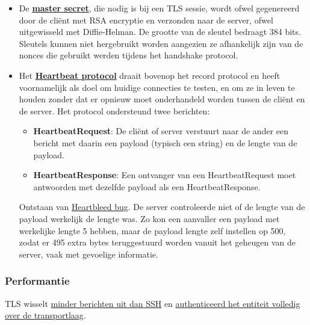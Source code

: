 \documentclass{report}
\begin{document}
\begin{itemize}
\begin{itemize}
		\end{itemize}
	De TLS record header heeft volgende structuur (figuur \ref{fig:tls_record_header}):
	\begin{figure}[ht]
		\texttt{[image: tls\_record\_header]}
		\caption{De TLS record header.}
		\label{fig:tls_record_header}
	\end{figure}
	\begin{itemize}
		\item 1 byte voor het contenttype. Dit is het applicatielaagprotocol dat gebruikt wordt.
		\item 2 bytes voor de versie (voor TLS 1.2 heeft dit de waarden 3 en 3).
		\item Lengte van de informatie.
	\end{itemize}

	\item De \underline{\textbf{master secret}}, die nodig is bij een TLS sessie, wordt ofwel gegenereerd door de cliënt met RSA encryptie en verzonden naar de server, ofwel uitgewisseld met Diffie-Helman. De grootte van de sleutel bedraagt 384 bits. Sleutels kunnen niet hergebruikt worden aangezien ze afhankelijk zijn van de nonces die gebruikt werden tijdens het handshake protocol.
	\item Het \underline{\textbf{Heartbeat protocol}} draait bovenop het record protocol en heeft voornamelijk als doel om huidige connecties te testen, en om ze in leven te houden zonder dat er opnieuw moet onderhandeld worden tussen de cliënt en de server. Het protocol ondersteund twee berichten:
		\begin{itemize}
			\item \textbf{HeartbeatRequest}: De cliënt of server verstuurt naar de ander een bericht met daarin een payload (typisch een string) en de lengte van de payload. 
			\item \textbf{HeartbeatResponse}: Een ontvanger van een HeartbeatRequest moet antwoorden met dezelfde payload als een HeartbeatResponse.
		\end{itemize}
	Ontstaan van \underline{Heartbleed bug}. De server controleerde niet of de lengte van de payload werkelijk de lengte was. Zo kon een aanvaller een payload met werkelijke lengte 5 hebben, maar de payload lengte zelf instellen op 500, zodat er 495 extra bytes teruggestuurd worden vanuit het geheugen van de server, vaak met gevoelige informatie.
\end{itemize}

	\subsubsection{Performantie}
	TLS wisselt \underline{minder berichten uit dan SSH} en \underline{authenticeerd het entiteit volledig over de transportlaag}. 
\end{document}
